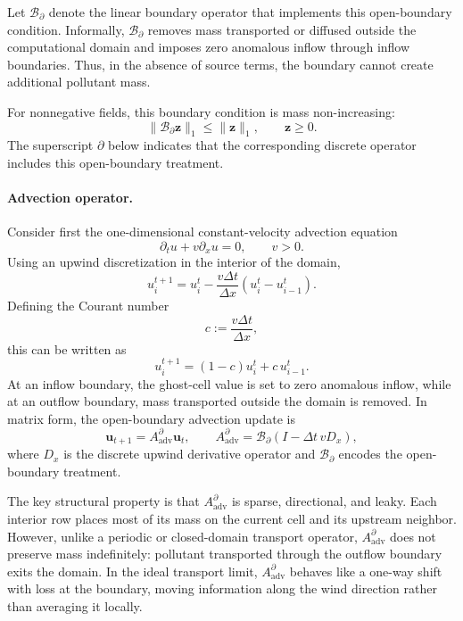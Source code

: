 Let $\mathcal{B}_{\partial}$ denote the linear boundary operator that implements this open-boundary condition. Informally, $\mathcal{B}_{\partial}$ removes mass transported or diffused outside the computational domain and imposes zero anomalous inflow through inflow boundaries. Thus, in the absence of source terms, the boundary cannot create additional pollutant mass.

For nonnegative fields, this boundary condition is mass non-increasing:
\begin{equation}
\|\mathcal{B}_{\partial}\mathbf{z}\|_1
\le
\|\mathbf{z}\|_1,
\qquad
\mathbf{z}\ge 0.
\nonumber
\end{equation}
The superscript $\partial$ below indicates that the corresponding discrete operator includes this open-boundary treatment.

\paragraph{Advection operator.}
Consider first the one-dimensional constant-velocity advection equation
\begin{equation}
\partial_t u + v \partial_x u = 0,
\qquad v>0. \nonumber
\end{equation}
Using an upwind discretization in the interior of the domain,
\begin{equation}
u_i^{t+1}
=
u_i^t - \frac{v\Delta t}{\Delta x}(u_i^t-u_{i-1}^t). \nonumber
\end{equation}
Defining the Courant number
\begin{equation}
c := \frac{v\Delta t}{\Delta x}, \nonumber
\end{equation}
this can be written as
\begin{equation}
u_i^{t+1} = (1-c)u_i^t + c\,u_{i-1}^t. \nonumber
\end{equation}
At an inflow boundary, the ghost-cell value is set to zero anomalous inflow, while at an outflow boundary, mass transported outside the domain is removed. In matrix form, the open-boundary advection update is
\begin{equation}
\mathbf{u}_{t+1}
=
A_{\mathrm{adv}}^{\partial}\mathbf{u}_t,
\qquad
A_{\mathrm{adv}}^{\partial}
=
\mathcal{B}_{\partial}
\left(I-\Delta t\, v D_x\right),
\label{eq:Aadv_def}
\end{equation}
where $D_x$ is the discrete upwind derivative operator and $\mathcal{B}_{\partial}$ encodes the open-boundary treatment.

The key structural property is that $A_{\mathrm{adv}}^{\partial}$ is sparse, directional, and leaky. Each interior row places most of its mass on the current cell and its upstream neighbor. However, unlike a periodic or closed-domain transport operator, $A_{\mathrm{adv}}^{\partial}$ does not preserve mass indefinitely: pollutant transported through the outflow boundary exits the domain. In the ideal transport limit, $A_{\mathrm{adv}}^{\partial}$ behaves like a one-way shift with loss at the boundary, moving information along the wind direction rather than averaging it locally.

